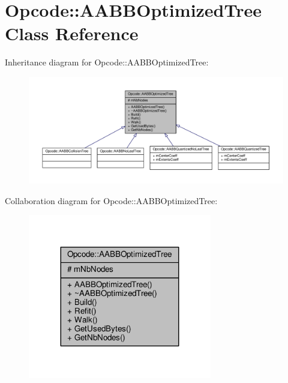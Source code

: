 \hypertarget{classOpcode_1_1AABBOptimizedTree}{}\section{Opcode\+:\+:A\+A\+B\+B\+Optimized\+Tree Class Reference}
\label{classOpcode_1_1AABBOptimizedTree}


Inheritance diagram for Opcode\+:\+:A\+A\+B\+B\+Optimized\+Tree\+:
\nopagebreak
\begin{figure}[H]
\begin{center}
\leavevmode
\includegraphics[width=350pt]{d8/d28/classOpcode_1_1AABBOptimizedTree__inherit__graph}
\end{center}
\end{figure}


Collaboration diagram for Opcode\+:\+:A\+A\+B\+B\+Optimized\+Tree\+:
\nopagebreak
\begin{figure}[H]
\begin{center}
\leavevmode
\includegraphics[width=227pt]{d4/d52/classOpcode_1_1AABBOptimizedTree__coll__graph}
\end{center}
\end{figure}
